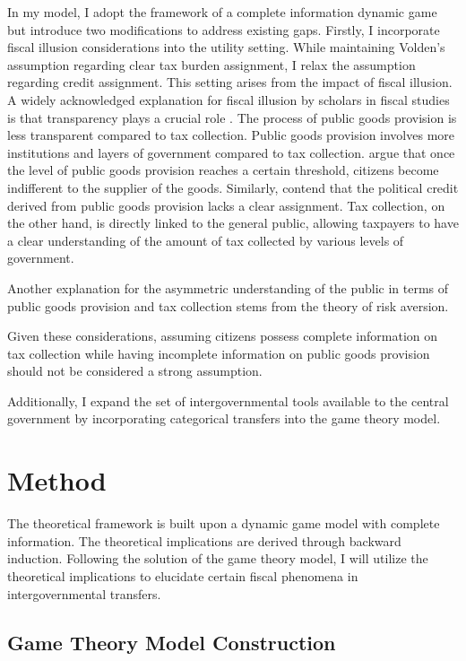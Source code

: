\documentclass[man]{apa7}
\begin{document}
In my model, I adopt the framework of a complete information dynamic game but introduce two modifications to address existing gaps. Firstly, I incorporate fiscal illusion considerations into the utility setting. While maintaining Volden's assumption regarding clear tax burden assignment, I relax the assumption regarding credit assignment. This setting arises from the impact of fiscal illusion. A widely acknowledged explanation for fiscal illusion by scholars in fiscal studies is that transparency plays a crucial role \parencite{mcgillivray2019aid,pommerehne1978fiscal, cepparulo2019public}. The process of public goods provision is less transparent compared to tax collection. Public goods provision involves more institutions and layers of government compared to tax collection. \Textcite{bednar2007credit} argue that once the level of public goods provision reaches a certain threshold, citizens become indifferent to the supplier of the goods. Similarly, \Textcite{nicholson2011claiming} contend that the political credit derived from public goods provision lacks a clear assignment. Tax collection, on the other hand, is directly linked to the general public, allowing taxpayers to have a clear understanding of the amount of tax collected by various levels of government.


Another explanation for the asymmetric understanding of the public in terms of public goods provision and tax collection stems from the theory of risk aversion.

Given these considerations, assuming citizens possess complete information on tax collection while having incomplete information on public goods provision should not be considered a strong assumption.

Additionally, I expand the set of intergovernmental tools available to the central government by incorporating categorical transfers into the game theory model.


\section{Method}
The theoretical framework is built upon a dynamic game model with complete information. The theoretical implications are derived through backward induction. Following the solution of the game theory model, I will utilize the theoretical implications to elucidate certain fiscal phenomena in intergovernmental transfers.


\subsection{Game Theory Model Construction}
\end{document}

